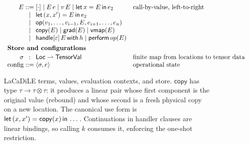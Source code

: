\begin{figure}[t]
\[\begin{array}{r@{\;}c@{\;}l@{\quad}l}
E & ::= & [\cdot] \mid E\, e \mid v\, E \mid \letin{x = E}{e_2} & \text{call-by-value, left-to-right} \\
  & \mid & \letpair{x}{x'}{E}{e_2} \\
  & \mid & \mathsf{op}(v_1, \dots, v_{i-1}, E, e_{i+1}, \dots, e_n) \\
  & \mid & \mathsf{copy}(E) \mid \mathsf{grad}(E) \mid \mathsf{vmap}(E) \\
  & \mid & \handlewith{\varepsilon}{E}{h} \mid \performop{op}(E) \\[4pt]
\multicolumn{4}{l}{\textbf{Store and configurations}} \\[2pt]
\sigma & : & \mathsf{Loc} \rightharpoonup \mathsf{TensorVal} & \text{finite map from locations to tensor data} \\
\text{config} & ::= & \langle \sigma, e \rangle & \text{operational state} \\
\end{array}
\]
\caption{LaCaDiLE terms, values, evaluation contexts, and store. $\mathsf{copy}$ has
type $\tau \to \tau \otimes \tau$: it produces a linear pair whose first component
is the original value (rebound) and whose second is a fresh physical copy on a new
location. The canonical use form is $\mathsf{let}\,(x, x') = \mathsf{copy}(x)\,\mathsf{in}\,\dots$.
Continuations in handler clauses are linear bindings, so calling $k$ consumes it,
enforcing the one-shot restriction.}
\label{fig:syntax-terms}
\end{figure}

